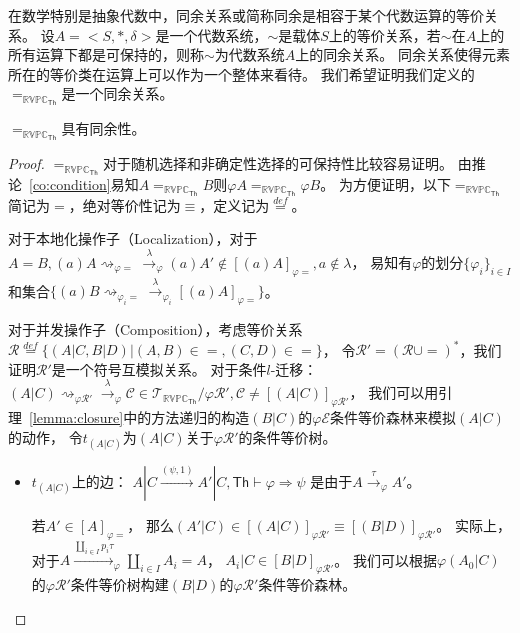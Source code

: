 在数学特别是抽象代数中，同余关系或简称同余是相容于某个代数运算的等价关系。
设$A=<S,*,\delta>$是一个代数系统，$\sim$是载体$S$上的等价关系，若$\sim$在$A$上的所有运算下都是可保持的，则称$\sim$为代数系统$A$上的同余关系\cite{Cougruence}。 
同余关系使得元素所在的等价类在运算上可以作为一个整体来看待。
我们希望证明我们定义的$=_{\mathbb{RVPC}_{\mathsf{Th}}}$是一个同余关系。

\begin{theorem}
   $=_{\mathbb{RVPC}_{\mathsf{Th}}}$具有同余性。
\end{theorem}
\begin{proof}
   $=_{\mathbb{RVPC}_{\mathsf{Th}}}$对于随机选择和非确定性选择的可保持性比较容易证明。
   由推论~\ref{co:condition}易知$A=_{\mathbb{RVPC}_{\mathsf{Th}}}B$则$\varphi A=_{\mathbb{RVPC}_{\mathsf{Th}}}\varphi B$。
   为方便证明，以下$=_{\mathbb{RVPC}_{\mathsf{Th}}}$简记为$=$，绝对等价性记为$\equiv$，定义记为$\stackrel{def}{=}$。
   
   对于本地化操作子（Localization），对于$A=B,(a)A\rightsquigarrow_{\varphi=}\stackrel{\lambda}{\rightarrow}_{\varphi} (a)A'\notin [(a)A]_{\varphi =}, a\notin \lambda$，
   易知有$\varphi$的划分$\{\varphi_i\}_{i\in I}$和集合$\{(a)B\rightsquigarrow_{\varphi_i=}\stackrel{\lambda}{\rightarrow}_{\varphi_i}[(a)A]_{\varphi =}\}$。

   对于并发操作子（Composition），考虑等价关系$\mathcal{R}\stackrel{def}{=}\{(A|C,B|D)|(A,B)\in =,(C,D)\in =\}$，
   令$\mathcal{R}' = (\mathcal{R}\cup =)^*$，我们证明$\mathcal{R}'$是一个符号互模拟关系。
   对于条件$l$-迁移：$(A|C)\rightsquigarrow_{\varphi\mathcal{R'}}\stackrel{\lambda}{\rightarrow}_{\varphi}\mathcal{C}\in\mathcal{T}_{\mathbb{RVPC}_{\mathsf{Th}}}/\varphi \mathcal{R}',\mathcal{C}\neq [(A|C)]_{\varphi\mathcal{R}'}$，
   我们可以用引理~\ref{lemma:closure}中的方法递归的构造$(B|C)$的$\varphi\mathcal{E}$条件等价森林来模拟$(A|C)$的动作，
   令$t_{(A|C)}$为$(A|C)$关于$\varphi\mathcal{R'}$的条件等价树。
   \begin{itemize}
      \item {
         $t_{(A|C)}$上的边：
         $A|C\stackrel{(\psi, 1)}{\rightarrow} A'|C, \mathsf{Th}\vdash \varphi\Rightarrow\psi$
         是由于$A\stackrel{\tau}{\rightarrow}_{\varphi} A'$。

         若$A'\in [A]_{\varphi =}$，
         那么$(A'|C)\in[(A|C)]_{\varphi\mathcal{R}'}\equiv[(B|D)]_{\varphi\mathcal{R}'}$。
         实际上，对于$A\stackrel{\coprod_{i\in I}p_i\tau}{\rightarrow}_{\varphi} \coprod_{i\in I} A_i=A$，
         $A_i|C\in [B|D]_{\varphi\mathcal{R}'}$。
         我们可以根据$\varphi (A_0|C)$的$\varphi\mathcal{R}'$条件等价树构建$(B|D)$的$\varphi\mathcal{R}'$条件等价森林。

}
\end{itemize}
\end{proof}
